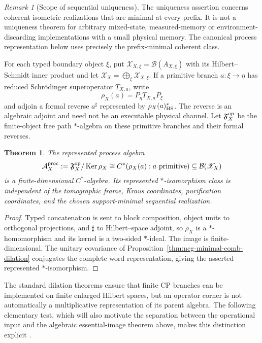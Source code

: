 \documentclass[11pt]{article}
\newtheorem{theorem}{Theorem}[section]
\theoremstyle{definition}
\theoremstyle{remark}
\newtheorem{remark}[remark]{Remark}
\theoremstyle{definition}
\theoremstyle{remark}
\newcommand{\Ker}{\operatorname{Ker}}
\newcommand{\A}{\mathcal A}
\begin{document}
\begin{remark}[Scope of sequential uniqueness]
The uniqueness assertion concerns coherent isometric realizations that are minimal
at every prefix.  It is not a uniqueness theorem for arbitrary mixed-state,
measured-memory or environment-discarding implementations with a small physical
memory.  The canonical process representation below uses precisely the
prefix-minimal coherent class.
\end{remark}

For each typed boundary object $\xi$, put
$\mathscr X_{X,\xi}=\mathcal B(A_{X,\xi})$ with its Hilbert--Schmidt inner
product and let $\mathscr X_X=\bigoplus_\xi\mathscr X_{X,\xi}$.  If a primitive
branch $a:\xi\to\eta$ has reduced Schr\"odinger superoperator $T_{X,a}$, write
\[
 \rho_X(a)=P_\eta T_{X,a}P_\xi
\]
and adjoin a formal reverse $a^\sharp$ represented by
$\rho_X(a)^*_{\rm HS}$.  The reverse is an algebraic adjoint and need not be an
executable physical channel.  Let $\mathfrak F_X^{\rm op}$ be the finite-object
free path $*$-algebra on these primitive branches and their formal reverses.

\begin{theorem}
\label{thm:ncg-process-history-representation}
The represented process algebra
\begin{equation}
 \A_X^{\rm proc}
 :=\mathfrak F_X^{\rm op}/\Ker\rho_X
 \cong C^*\!\left(\rho_X(a):a\text{ primitive}\right)
 \subseteq\mathcal B(\mathscr X_X)
 \label{eq:ncg-process-algebra}
\end{equation}
is a finite-dimensional $C^*$-algebra.  Its represented $*$-isomorphism class is
independent of the tomographic frame, Kraus coordinates, purification coordinates,
and the chosen support-minimal sequential realization.
\end{theorem}

\begin{proof}
Typed concatenation is sent to block composition, object units to orthogonal
projections, and $\sharp$ to Hilbert--space adjoint, so $\rho_X$ is a
$*$-homomorphism and its kernel is a two-sided $*$-ideal.  The image is
finite-dimensional.  The unitary covariance of
Proposition~\ref{thm:ncg-minimal-comb-dilation} conjugates the complete word
representation, giving the asserted represented $*$-isomorphism.
\end{proof}

The standard dilation theorems ensure that finite CP branches can be implemented
on finite enlarged Hilbert spaces, but an operator corner is not automatically a
multiplicative representation of its parent algebra.  The following elementary
test, which will also motivate the separation between the operational input
and the algebraic essential-image theorem above, makes this distinction explicit
\cite{Stinespring1955,Holevo1982}.
\end{document}
